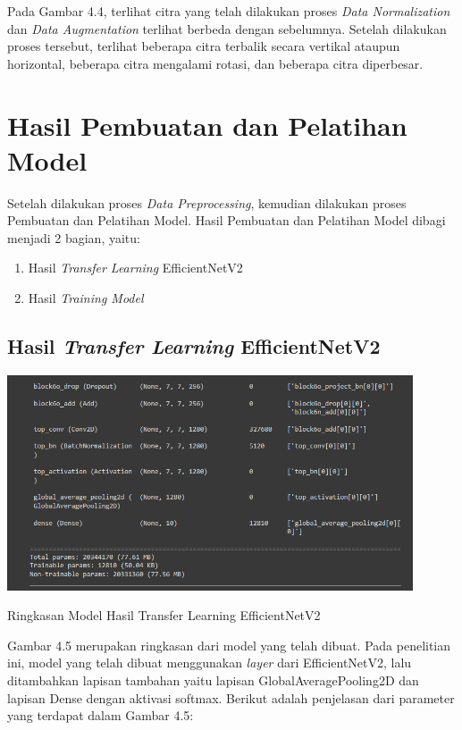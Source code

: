 Pada Gambar 4.4, terlihat citra yang telah dilakukan proses \textit{Data Normalization} dan \textit{Data Augmentation} terlihat berbeda dengan sebelumnya. Setelah dilakukan proses tersebut, terlihat beberapa citra terbalik secara vertikal ataupun horizontal, beberapa citra mengalami rotasi, dan beberapa citra diperbesar.

\section{Hasil Pembuatan dan Pelatihan Model}
Setelah dilakukan proses \textit{Data Preprocessing}, kemudian dilakukan proses Pembuatan dan Pelatihan Model. Hasil Pembuatan dan Pelatihan Model dibagi menjadi 2 bagian, yaitu:
\begin{enumerate}
    \item Hasil \textit{Transfer Learning} EfficientNetV2
    \item Hasil \textit{Training Model}
\end{enumerate}

\subsection{Hasil \textit{Transfer Learning} EfficientNetV2}
\begin{afigure}
    \includegraphics[width=0.9\textwidth, center]{images/model-summary.png}
    \caption{Ringkasan Model Hasil Transfer Learning EfficientNetV2}
    \label{fig:model-summary}
\end{afigure}

Gambar 4.5 merupakan ringkasan dari model yang telah dibuat. Pada penelitian ini, model yang telah dibuat menggunakan \textit{layer} dari EfficientNetV2, lalu ditambahkan lapisan tambahan yaitu lapisan GlobalAveragePooling2D dan lapisan Dense dengan aktivasi softmax. Berikut adalah penjelasan dari parameter yang terdapat dalam Gambar 4.5:

